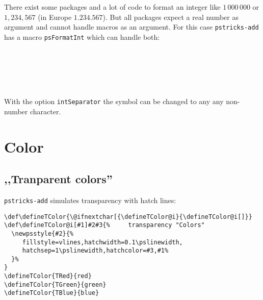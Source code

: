 \section{}
There exist some packages and a lot of code to format an integer like $1\,000\,000$
or $1,234,567$ (in Europe $1.234.567$). But all packages expect a real number as
argument and cannot handle macros as an argument. For this case \verb|pstricks-add|
has a macro \verb|psFormatInt| which can handle both:

\begin{LTXexample}[width=3cm]
\\
\\
\\
\\
\def\temp{965432}
\psFormatInt{\temp}
\end{LTXexample}

With the option \verb|intSeparator| the symbol can be changed to any any non-number character.


\section{Color}

\subsection{,,Tranparent colors''}

\verb+pstricks-add+ simulates transparency with hatch lines:
\begin{lstlisting}
\def\defineTColor{\@ifnextchar[{\defineTColor@i}{\defineTColor@i[]}}
\def\defineTColor@i[#1]#2#3{%     transparency "Colors"
  \newpsstyle{#2}{%
     fillstyle=vlines,hatchwidth=0.1\pslinewidth,
     hatchsep=1\pslinewidth,hatchcolor=#3,#1%
  }%
}
\defineTColor{TRed}{red}
\defineTColor{TGreen}{green}
\defineTColor{TBlue}{blue}
\end{lstlisting}

